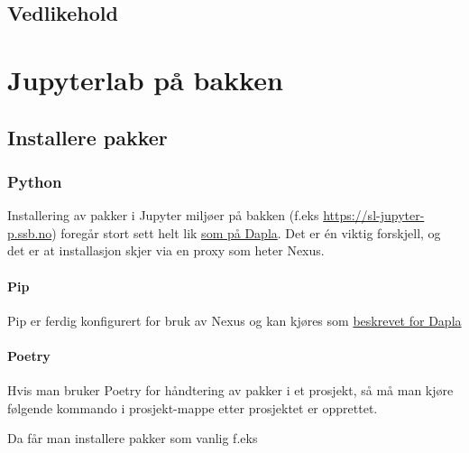 \documentclass[
  letterpaper,
  DIV=11,
  numbers=noendperiod]{scrreprt}
\newenvironment{Shaded}{\begin{snugshade}}{\end{snugshade}}
\newcommand{\NormalTok}[1]{\textcolor[rgb]{0.00,0.23,0.31}{#1}}
\begin{document}
\hypertarget{vedlikehold}{%
\chapter{Vedlikehold}\label{vedlikehold}}

\part{Jupyterlab på bakken}

\hypertarget{installere-pakker-1}{%
\chapter{Installere pakker}\label{installere-pakker-1}}

\hypertarget{python-2}{%
\section{Python}\label{python-2}}

Installering av pakker i Jupyter miljøer på bakken (f.eks
\url{https://sl-jupyter-p.ssb.no}) foregår stort sett helt lik
\href{./pakke-install.html}{som på Dapla}. Det er én viktig forskjell,
og det er at installasjon skjer via en proxy som heter Nexus.

\hypertarget{pip}{%
\subsection{Pip}\label{pip}}

Pip er ferdig konfigurert for bruk av Nexus og kan kjøres som
\href{./pakke-install.html}{beskrevet for Dapla}

\hypertarget{poetry}{%
\subsection{Poetry}\label{poetry}}

Hvis man bruker Poetry for håndtering av pakker i et prosjekt, så må man
kjøre følgende kommando i prosjekt-mappe etter prosjektet er opprettet.

\begin{Shaded}
\end{Shaded}

Da får man installere pakker som vanlig f.eks
\end{document}
